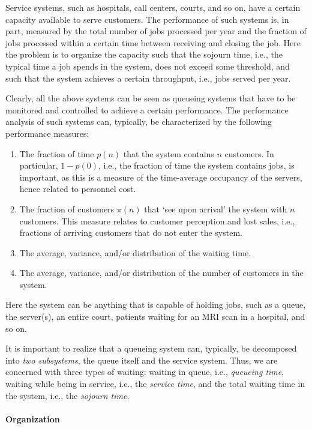 Service systems, such as hospitals, call centers, courts, and so on,
have a certain capacity available to serve customers. The performance
of such systems is, in part, measured by the total number of jobs
processed per year and the fraction of jobs processed within a certain
time between receiving and closing the job. Here the problem is to
organize the capacity such that the sojourn time, i.e., the typical
time a job spends in the system, does not exceed some threshold, and
such that the system achieves a certain throughput, i.e., jobs served
per year. 

Clearly, all the above systems can be seen as queueing systems that
have to be monitored and controlled to achieve a certain
performance. The performance analysis of such systems can, typically,
be characterized by the following performance measures:
\begin{enumerate}
\item The fraction of time $p(n)$ that the system contains $n$
  customers. In particular, $1-p(0)$, i.e., the fraction of time the
  system contains jobs, is important, as this is a measure of the
  time-average occupancy of the servers, hence related to personnel
  cost.
\item The fraction of customers $\pi(n)$ that `see upon arrival' the
  system with $n$ customers. This measure relates to customer
  perception and lost sales, i.e., fractions of arriving customers
  that do not enter the system.
\item The average, variance, and/or distribution of the waiting time.
\item The average, variance, and/or distribution of the number of customers in the system.\
\end{enumerate}
Here the system can be anything that is capable of holding jobs, such
as a queue, the server(s), an entire court, patients waiting for
an MRI scan in a hospital, and so on.

It is important to realize that a queueing system can, typically, be
decomposed into \emph{two subsystems}, the queue itself and the
service system. Thus, we are concerned with three types of waiting:
waiting in queue, i.e., \emph{queueing time}, waiting while being in
service, i.e., the \emph{service time}, and the total waiting time in
the system, i.e., the \emph{sojourn time}.

\paragraph{Organization}


